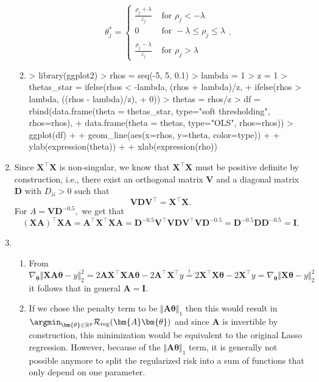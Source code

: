 \begin{enumerate}
\begin{enumerate}
    $$\theta^*_j =\begin{cases}
        \frac{\rho_j + \lambda}{z_j} & \text{ for } \rho_j < -\lambda\\
        0 & \text{ for }  -\lambda \leq \rho_j \leq \lambda\\
       \frac{\rho_j - \lambda}{z_j} & \text{ for } \rho_j > \lambda
    \end{cases}.$$
\item
\begin{Schunk}
\begin{Sinput}
> library(ggplot2)
> rhos = seq(-5, 5, 0.1)
> lambda = 1
> z = 1
> thetas_star = ifelse(rhos < -lambda, (rhos + lambda)/z,
+                      ifelse(rhos > lambda, ((rhos - lambda)/z), 
+                             0))
> thetas = rhos/z
> df = rbind(data.frame(theta = thetas_star, type="soft thresholding", rhos=rhos),
+       data.frame(theta = thetas, type="OLS", rhos=rhos))
> ggplot(df) +
+   geom_line(aes(x=rhos, y=theta, color=type)) +
+   ylab(expression(theta)) +
+   xlab(expression(rho))
\end{Sinput}
\end{Schunk}
\end{enumerate}
    \item Since $\mathbf{X}^\top \mathbf{X}$ is non-singular, we know that $\mathbf{X}^\top \mathbf{X}$ must be positive definite by construction, i.e., there exist an orthogonal matrix $\bm{V}$ and a diagonal matrix $\bm{D}$ with $D_{ii} > 0$ such that 
    $$\bm{V}\bm{D}\bm{V}^\top = \mathbf{X}^\top \mathbf{X}.$$
    For $A = \bm{V}\bm{D}^{-0.5},$ we get that 
    $$(\bm{X}\bm{A})^\top\bm{X}\bm{A} = \bm{A}^\top\bm{X}^\top\bm{X}\bm{A} = \bm{D}^{-0.5}\bm{V}^\top\bm{V}\bm{D}\bm{V}^\top\bm{V}\bm{D}^{-0.5} = \bm{D}^{-0.5}\bm{D}\bm{D}^{-0.5} = \bm{I}.$$
\item 
\begin{enumerate}
    \item From $\nabla_{\bm{\theta}}\Vert \mathbf{X}\bm{A}\bm{\theta} - y\Vert^2_2 = 2\bm{A}\mathbf{X}^\top\mathbf{X}\bm{A}\bm{\theta} - 2\bm{A}^\top\bm{X}^\top y \overset{!}{=} 2\bm{X}^\top\mathbf{X}\bm{\theta} - 2\bm{X}^\top y = \nabla_{\bm{\theta}}\Vert \mathbf{X}\bm{\theta} - y\Vert^2_2$ it follows that in general $\bm{A} = \bm{I}.$
    \item If we chose the penalty term to be $\Vert \bm{A}\bm{\theta}\Vert_1$ then this would result in $\argmin_{\bm{\theta}\in\mathbb{R}^p} \mathcal{R}_\text{reg}(\bm{A}\bm{\theta})$ and since $\bm{A}$ is invertible by construction, this minimization would be equivalent to the original Lasso regression. However, because of the $\Vert \bm{A}\bm{\theta}\Vert_1$ term, it is generally not possible anymore to split the regularized risk into a sum of functions that only depend on one parameter.

\end{enumerate}
\end{enumerate}
